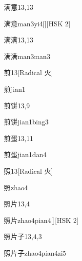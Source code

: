 \begin{entry}{满意}{13,13}
  \begin{phonetics}{满意}{man3yi4}[][HSK 2]
  \end{phonetics}
\end{entry}

\begin{entry}{满满}{13,13}
  \begin{phonetics}{满满}{man3man3}
  \end{phonetics}
\end{entry}

\begin{entry}{煎}{13}[Radical 火]
  \begin{phonetics}{煎}{jian1}
  \end{phonetics}
\end{entry}

\begin{entry}{煎饼}{13,9}
  \begin{phonetics}{煎饼}{jian1bing3}
  \end{phonetics}
\end{entry}

\begin{entry}{煎蛋}{13,11}
  \begin{phonetics}{煎蛋}{jian1dan4}
  \end{phonetics}
\end{entry}

\begin{entry}{照}{13}[Radical 火]
  \begin{phonetics}{照}{zhao4}
  \end{phonetics}
\end{entry}

\begin{entry}{照片}{13,4}
  \begin{phonetics}{照片}{zhao4pian4}[][HSK 2]
  \end{phonetics}
\end{entry}

\begin{entry}{照片子}{13,4,3}
  \begin{phonetics}{照片子}{zhao4pian4zi5}
  \end{phonetics}
\end{entry}

